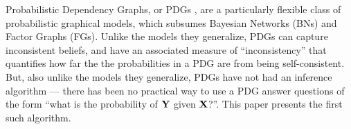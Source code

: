 \documentclass[twoside]{article}
\begin{document}
Probabilistic Dependency Graphs, or PDGs \parencite{pdg-aaai},
are a particularly flexible class of probabilistic graphical models, which subsumes Bayesian Networks (BNs)
and Factor Graphs (FGs).
Unlike the models they generalize,
PDGs can capture inconsistent beliefs, and have an associated measure
of ``inconsistency'' that quantifies how far the the probabilities in a PDG are from being self-consistent.
But, also unlike the models they generalize,
PDGs have not had an inference algorithm%
---%
there has been no practical way to use a PDG answer questions of the form
    ``what is the probability of $\mathbf{Y}$ given $\mathbf{X}$?''.
This paper presents the first such algorithm.
\end{document}
